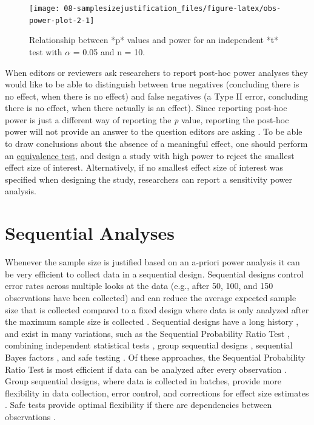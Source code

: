 \documentclass[
  oneside]{book}
\begin{document}
\begin{figure}

{\centering \texttt{[image: 08-samplesizejustification\_files/figure-latex/obs-power-plot-2-1]} 

}

\caption{Relationship between *p* values and power for an independent *t* test with $\alpha$ = 0.05 and n = 10.}\label{fig:obs-power-plot-2}
\end{figure}

When editors or reviewers ask researchers to report post-hoc power analyses they would like to be able to distinguish between true negatives (concluding there is no effect, when there is no effect) and false negatives (a Type II error, concluding there is no effect, when there actually is an effect). Since reporting post-hoc power is just a different way of reporting the \emph{p} value, reporting the post-hoc power will not provide an answer to the question editors are asking \citep{hoenig_abuse_2001, lenth_post_2007, yuan_post_2005, schulz_sample_2005}. To be able to draw conclusions about the absence of a meaningful effect, one should perform an \protect\hyperlink{equivalencetest}{equivalence test}, and design a study with high power to reject the smallest effect size of interest. Alternatively, if no smallest effect size of interest was specified when designing the study, researchers can report a sensitivity power analysis.

\hypertarget{sequentialsamplesize}{%
\section{Sequential Analyses}\label{sequentialsamplesize}}

Whenever the sample size is justified based on an a-priori power analysis it can be very efficient to collect data in a sequential design. Sequential designs control error rates across multiple looks at the data (e.g., after 50, 100, and 150 observations have been collected) and can reduce the average expected sample size that is collected compared to a fixed design where data is only analyzed after the maximum sample size is collected \citep{wassmer_group_2016, proschan_statistical_2006}. Sequential designs have a long history \citep{dodge_method_1929}, and exist in many variations, such as the Sequential Probability Ratio Test \citep{wald_sequential_1945}, combining independent statistical tests \citep{westberg_combining_1985}, group sequential designs \citep{jennison_group_2000}, sequential Bayes factors \citep{schonbrodt_sequential_2017}, and safe testing \citep{grunwald_safe_2019}. Of these approaches, the Sequential Probability Ratio Test is most efficient if data can be analyzed after every observation \citep{schnuerch_controlling_2020}. Group sequential designs, where data is collected in batches, provide more flexibility in data collection, error control, and corrections for effect size estimates \citep{wassmer_group_2016}. Safe tests provide optimal flexibility if there are dependencies between observations \citep{ter_schure_accumulation_2019}.
\end{document}
